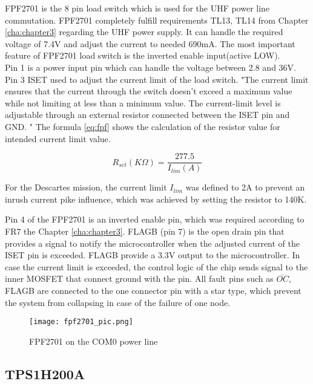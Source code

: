 FPF2701 is the 8 pin load switch which is used for the UHF power line commutation. FPF2701 completely fulfill requirements TL13, TL14 from Chapter \ref{cha:chapter3} regarding the UHF power supply. It can handle the required voltage of 7.4V and adjust the current to needed 690mA. The most important feature of FPF2701 load switch is the inverted enable input(active LOW).\\

Pin 1 is a power input pin which can handle the voltage between 2.8 and 36V. Pin 3 ISET used to adjust the current limit of the load switch. \cite{27} "The  current  limit  ensures  that  the  current  through  the switch  doesn't  exceed  a  maximum  value  while  not limiting  at  less  than  a  minimum  value.  The current-limit level    is    adjustable    through    an    external    resistor connected between the ISET pin and GND. " The formula \ref{eq:fpf} shows the calculation of the resistor value for intended current limit value.

\begin{equation}\label{eq:fpf}
R_{set}(K\Omega) = \frac{277.5}{I_{lim}(A)}
\end{equation}

For the Descartes mission, the current limit $I_{lim}$ was defined to 2A to prevent an inrush current pike influence, which was achieved by setting the resistor to 140K.

Pin 4 of the FPF2701 is an inverted enable pin, which was required according to FR7 the Chapter \ref{cha:chapter3}. FLAGB (pin 7) is the open drain pin that provides a signal to notify the microcontroller when the adjusted current of the ISET pin is exceeded. FLAGB provide a 3.3V output to the microcontroller. In case the current limit is exceeded, the control logic of the chip sends signal to the inner MOSFET that connect ground with the pin. All fault pins such as $\overline{OC}$, FLAGB  are connected to the one connector pin with a star type, which prevent the system from collapsing in case of the failure of one node.

\begin{figure}[h]
	\centering
	\texttt{[image: fpf2701\_pic.png]}
	\caption{FPF2701 on the COM0 power line}
	\label{fig: fpf27_schema}
\end{figure} 

\subsection{TPS1H200A}

